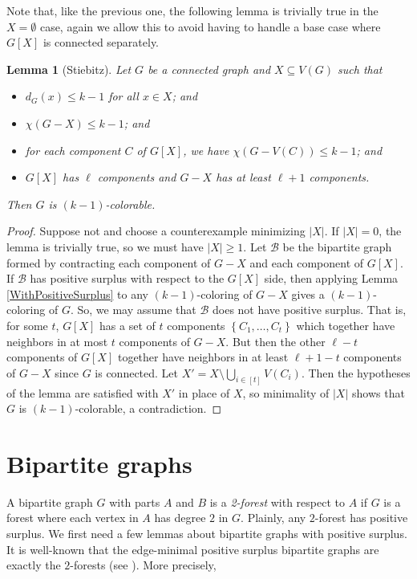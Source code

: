 \documentclass[12pt]{article}
\theoremstyle{plain}
\newtheorem{lem}[thm]{Lemma}
\theoremstyle{definition}
\theoremstyle{remark}
\newcommand{\fancy}[1]{\mathcal{#1}}
\newcommand{\B}{\fancy{B}}
\newcommand{\set}[1]{\left\{ #1 \right\}}
\newcommand{\irange}[1]{\left[#1\right]}
\begin{document}
Note that, like the previous one, the following lemma is trivially true in the $X = \emptyset$ case, again we allow this to avoid having to handle a base case where $G[X]$ is connected separately.
\begin{lem}[Stiebitz]
Let $G$ be a connected graph and $X \subseteq V(G)$ such that
\begin{itemize}
\item $d_G(x) \le k - 1$ for all $x \in X$; and
\item $\chi(G-X) \le k-1$; and
\item for each component $C$ of $G[X]$, we have $\chi(G - V(C)) \le k - 1$; and
\item $G[X]$ has $\ell$ components and $G-X$ has at least $\ell + 1$ components.
\end{itemize}
Then $G$ is $(k-1)$-colorable.
\label{MainLemma}
\end{lem}
\begin{proof}
Suppose not and choose a counterexample minimizing $|X|$.  If $|X| = 0$, the lemma is trivially true, so we must have $|X| \ge 1$.
Let $\B$ be the bipartite graph formed by contracting each component of $G-X$ and each component of $G[X]$.  If $\B$ has positive surplus with respect to the $G[X]$ side, then applying Lemma \ref{WithPositiveSurplus} to any $(k-1)$-coloring of $G-X$ gives a $(k-1)$-coloring of $G$.  So, we may assume that $\B$ does not have positive surplus.  That is, for some $t$, $G[X]$ has a set of $t$ components $\set{C_1, \ldots, C_t}$ which together have neighbors in at most $t$ components of $G-X$.  But then the other $\ell - t$ components of $G[X]$ together have neighbors in at least $\ell + 1 - t$ components of $G-X$ since $G$ is connected.  Let $X' = X \setminus \bigcup_{i \in \irange{t}} V(C_i)$.  Then the hypotheses of the lemma are satisfied with $X'$ in place of $X$, so minimality of $|X|$ shows that $G$ is $(k-1)$-colorable, a contradiction.
\end{proof}

\section*{Bipartite graphs}
A bipartite graph $G$ with parts $A$ and $B$ is a \emph{2-forest} with respect to $A$ if $G$ is a forest where each vertex in $A$ has degree $2$ in $G$.  Plainly, any $2$-forest has positive surplus.  We first need a few lemmas about bipartite graphs with positive surplus.  It is well-known that the edge-minimal positive surplus bipartite graphs are exactly the $2$-forests (see \cite{laszlo2009matching}).  More precisely,
\end{document}
